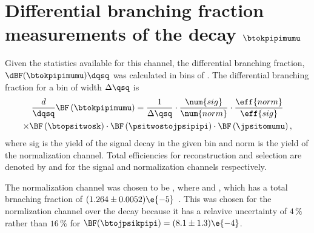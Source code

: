 \section[Differential branching fraction measurements of the decay \btokpipimumu]{
  Differential branching fraction measurements of the decay $\boldsymbol{\btokpipimumu}$
}

Given the statistics available for this channel, the differential branching fraction,
$\dBF(\btokpipimumu)\dqsq$ was calculated in bins of \qsq.
The differential branching fraction for a bin of width $\Delta\qsq$ is
\begin{multline}
  \frac{d}{\dqsq}\BF\left(\btokpipimumu\right)
  =
  \frac{1}{\Delta\qsq} \cdot
  \frac{\num{sig}}{\num{norm}} \cdot
  \frac{\eff{norm}}{\eff{sig}} \\
  \times\BF\left(\btopsitwosk\right) \cdot
  \BF\left(\psitwostojpsipipi\right) \cdot
  \BF\left(\jpsitomumu\right),
\end{multline}
where \num{sig} is the yield of the signal decay \btokpipimumu in the given \qsq bin and \num{norm}
is the yield of the normalization channel.
Total efficiencies for reconstruction and selection are denoted by  and  for the
signal and normalization channels respectively.

The normalization channel was chosen to be \btopsitwosk, where \psitwostojpsipipi and \jpsitomumu,
which has a total brnaching fraction of $(1.264 \pm 0.0052)\e{-5}$~\cite{PDG2012}.
This was chosen for the normlization channel over the decay \btojpsikpipi because it has a relavive
uncertainty of $4\,\%$ rather than $16\,\%$ for $\BF(\btojpsikpipi) = (8.1\pm1.3)\e{-4}$.
















